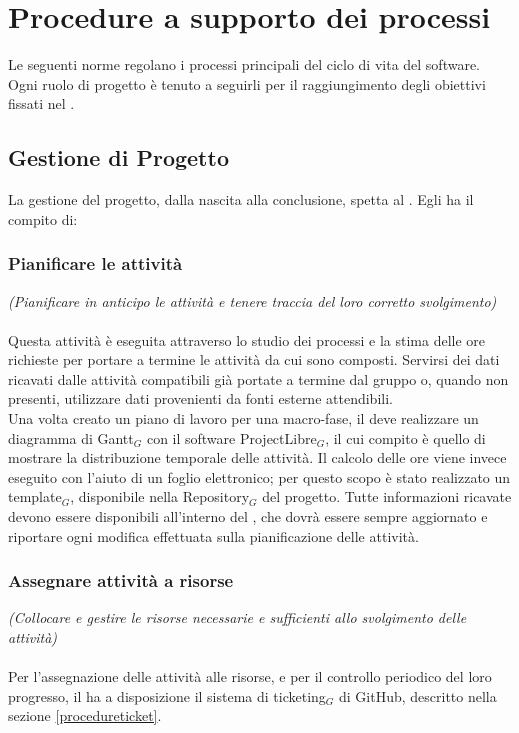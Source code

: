 \section{Procedure a supporto dei processi} \label{procedure}
Le seguenti norme regolano i processi principali del ciclo di vita del software. Ogni ruolo di progetto è tenuto a seguirli per il raggiungimento degli obiettivi fissati nel \PdQ .

\subsection{Gestione di Progetto}
La gestione del progetto, dalla nascita alla conclusione, spetta al \ruoloResponsabile . Egli ha il compito di:
\subsubsection{Pianificare le attività}
\textit{(Pianificare in anticipo le attività e tenere traccia del loro corretto svolgimento)} \\ \\
Questa attività è eseguita attraverso lo studio dei processi e la stima delle ore richieste per portare a termine le attività da cui sono composti. Servirsi dei dati ricavati dalle attività compatibili già portate a termine dal gruppo o, quando non presenti, utilizzare dati provenienti da fonti esterne attendibili. \\
Una volta creato un piano di lavoro per una macro-fase, il \ruoloResponsabile{}  deve realizzare un diagramma di Gantt$_G$ con il software ProjectLibre$_G$, il cui compito è quello di mostrare la distribuzione temporale delle attività. Il calcolo delle ore viene invece eseguito con l'aiuto di un foglio elettronico; per questo scopo è stato realizzato un template$_G$, disponibile nella Repository$_G$ del progetto. Tutte informazioni ricavate devono essere disponibili all'interno del \PdP , che dovrà essere sempre aggiornato e riportare ogni modifica effettuata sulla pianificazione delle attività.

\subsubsection{Assegnare attività a risorse}
\textit{(Collocare e gestire le risorse necessarie e sufficienti allo svolgimento delle attività)}\\ \\
Per l'assegnazione delle attività alle risorse, e per il controllo periodico del loro progresso, il \ruoloResponsabile{} ha a disposizione il sistema di ticketing$_G$ di GitHub, descritto nella sezione \ref{procedureticket}.
